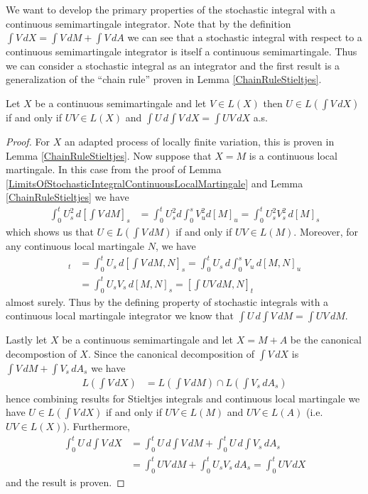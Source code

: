 We want to develop the primary properties of the stochastic integral with a continuous semimartingale integrator.  Note that by the definition $\int V \, dX = \int V \, dM + \int V \, dA$ we can see that a stochastic integral with respect to a continuous semimartingale integrator is itself a continuous semimartingale.  Thus we can consider a stochastic integral as an integrator and the first result is a generalization of the ``chain rule'' proven in Lemma \ref{ChainRuleStieltjes}.
\begin{lem}\label{ChainRuleContinuousSemimartingale}Let $X$ be a continuous semimartingale and let $V \in L(X)$ then $U \in L(\int V \, dX)$ if and only if $UV \in L(X)$ and $\int U \, d\int V \, dX = \int UV \, dX$ a.s.
\end{lem}
\begin{proof}
For $X$ an adapted process of locally finite variation, this is proven in Lemma \ref{ChainRuleStieltjes}.  Now suppose that $X =M$ is a continuous local martingale.  In this case from the proof of Lemma \ref{LimitsOfStochasticIntegralContinuousLocalMartingale} and Lemma \ref{ChainRuleStieltjes} we have 
\begin{align*}
\int_0^t U_s^2 \, d[\int V \, dM]_s &= \int_0^t U_s^2 d \int_0^s V_u^2 d[M]_u = \int_0^t U_s^2 V_s^2 \, d[M]_s
\end{align*}
which shows us that $U \in L(\int V \, dM)$ if and only if $UV \in L(M)$.  Moreover, for any continuous local martingale $N$, we have
\begin{align*}
[\int U \, d\int V \, dM, N]_t &= \int_0^t U_s \, d[\int V \, dM, N]_s = \int_0^t U_s \, d \int_0^s V_u \, d[M, N]_u \\
&= \int_0^t U_s V_s \, d[M,N]_s = [\int UV \, dM, N]_t
\end{align*}
almost surely.  Thus by the defining property of stochastic integrals with a continuous local martingale integrator we know that $\int U \, d\int V \, dM = \int UV \, dM$.

Lastly let $X$ be a continuous semimartingale and let $X = M + A$ be the canonical decompostion of $X$.  Since the canonical decomposition of $\int V \, dX$ is $\int V \, dM + \int V_s \, dA_s$ we have 
\begin{align*}
L(\int V \, dX) &= L(\int V \, dM) \cap L(\int V_s \, dA_s) 
\end{align*}
hence combining results for Stieltjes integrals and continuous local martingale we have $U \in L(\int V \, dX)$ if and only if $UV \in L(M)$ and $UV \in L(A)$ (i.e. $UV \in L(X)$).  Furthermore,
\begin{align*}
\int_0^t U \, d\int V \, dX &= \int_0^t U \, d\int V \, dM + \int_0^t U \, d \int V_s \, dA_s \\
&= \int_0^t UV \, dM + \int_0^t U_s V_s \, dA_s = \int_0^t UV \, dX
\end{align*}
and the result is proven.
\end{proof}

